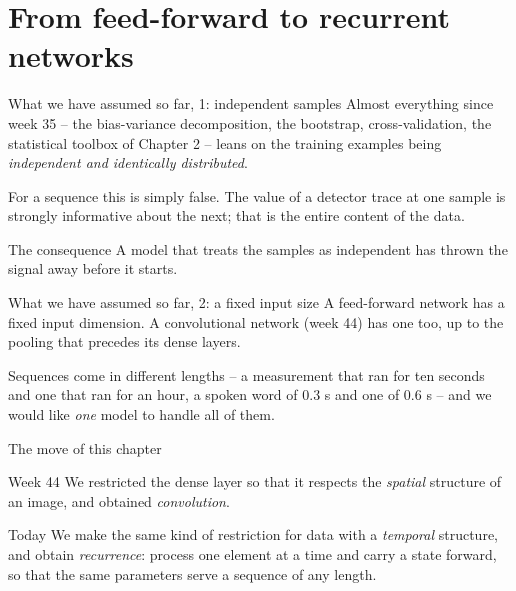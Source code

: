 \documentclass[10pt,aspectratio=169]{beamer}
\begin{document}
\section{From feed-forward to recurrent networks}
\begin{frame}{What we have assumed so far, 1: independent samples}
Almost everything since week 35 -- the bias-variance decomposition, the
bootstrap, cross-validation, the statistical toolbox of Chapter 2 -- leans
on the training examples being \emph{independent and identically
distributed}.

\medskip
For a sequence this is simply false.  The value of a detector trace at one
sample is strongly informative about the next; that is the entire content
of the data.

\medskip
\begin{block}{The consequence}
A model that treats the samples as independent has thrown the signal away
before it starts.
\end{block}
\end{frame}

\begin{frame}{What we have assumed so far, 2: a fixed input size}
A feed-forward network has a fixed input dimension.  A convolutional
network (week 44) has one too, up to the pooling that precedes its dense
layers.

\medskip
Sequences come in different lengths -- a measurement that ran for ten
seconds and one that ran for an hour, a spoken word of $0.3$ s and one of
$0.6$ s -- and we would like \emph{one} model to handle all of them.
\end{frame}

\begin{frame}{The move of this chapter}
\begin{block}{Week 44}
We restricted the dense layer so that it respects the \emph{spatial}
structure of an image, and obtained \emph{convolution}.
\end{block}
\begin{block}{Today}
We make the same kind of restriction for data with a \emph{temporal}
structure, and obtain \emph{recurrence}: process one element at a time and
carry a state forward, so that the same parameters serve a sequence of any
length.
\end{block}
\end{frame}
\end{document}
